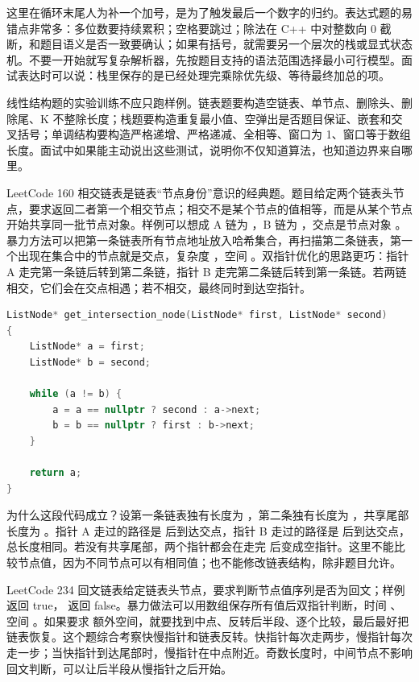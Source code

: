 这里在循环末尾人为补一个加号，是为了触发最后一个数字的归约。表达式题的易错点非常多：多位数要持续累积；空格要跳过；除法在 C++ 中对整数向 0 截断，和题目语义是否一致要确认；如果有括号，就需要另一个层次的栈或显式状态机。不要一开始就写复杂解析器，先按题目支持的语法范围选择最小可行模型。面试表达时可以说：栈里保存的是已经处理完乘除优先级、等待最终加总的项。

线性结构题的实验训练不应只跑样例。链表题要构造空链表、单节点、删除头、删除尾、K 不整除长度；栈题要构造重复最小值、空弹出是否题目保证、嵌套和交叉括号；单调结构要构造严格递增、严格递减、全相等、窗口为 1、窗口等于数组长度。面试中如果能主动说出这些测试，说明你不仅知道算法，也知道边界来自哪里。

LeetCode 160 相交链表是链表“节点身份”意识的经典题。题目给定两个链表头节点，要求返回二者第一个相交节点；相交不是某个节点的值相等，而是从某个节点开始共享同一批节点对象。样例可以想成 A 链为 ，B 链为 ，交点是节点对象 。暴力方法可以把第一条链表所有节点地址放入哈希集合，再扫描第二条链表，第一个出现在集合中的节点就是交点，复杂度 ，空间 。双指针优化的思路更巧：指针 A 走完第一条链后转到第二条链，指针 B 走完第二条链后转到第一条链。若两链相交，它们会在交点相遇；若不相交，最终同时到达空指针。

\begin{lstlisting}[language=C++,caption={LeetCode 160 相交链表：双指针走完两条路径}]
ListNode* get_intersection_node(ListNode* first, ListNode* second)
{
    ListNode* a = first;
    ListNode* b = second;

    while (a != b) {
        a = a == nullptr ? second : a->next;
        b = b == nullptr ? first : b->next;
    }

    return a;
}
\end{lstlisting}

为什么这段代码成立？设第一条链表独有长度为 ，第二条独有长度为 ，共享尾部长度为 。指针 A 走过的路径是  后到达交点，指针 B 走过的路径是  后到达交点，总长度相同。若没有共享尾部，两个指针都会在走完  后变成空指针。这里不能比较节点值，因为不同节点可以有相同值；也不能修改链表结构，除非题目允许。

LeetCode 234 回文链表给定链表头节点，要求判断节点值序列是否为回文；样例  返回 true， 返回 false。暴力做法可以用数组保存所有值后双指针判断，时间 、空间 。如果要求  额外空间，就要找到中点、反转后半段、逐个比较，最后最好把链表恢复。这个题综合考察快慢指针和链表反转。快指针每次走两步，慢指针每次走一步；当快指针到达尾部时，慢指针在中点附近。奇数长度时，中间节点不影响回文判断，可以让后半段从慢指针之后开始。

